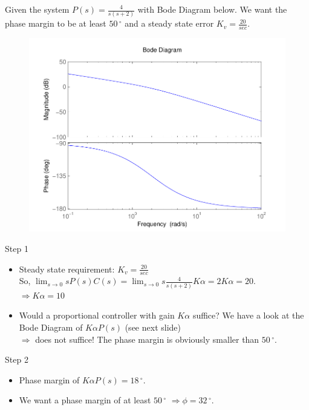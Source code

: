 \begin{frame}
\begin{example}
	Given the system $P(s) = \frac{4}{s(s+2)}$ with Bode Diagram below. 
	\vspace{0.1 cm}
	We want the phase margin to be at least $50\,^{\circ}$ and a steady state error $K_v = \frac{20}{sec}$.
	\begin{figure}
		\centering
		\includegraphics[width=0.5
		\linewidth]{bodeexamplelead}
	\end{figure}
\end{example}
\end{frame}

\begin{frame}
\begin{exampleblock}{Step 1}
\begin{itemize}	
\item Steady state requirement: $K_v = \frac{20}{sec}$ \\
So, $\lim_{s \to 0} sP(s)C(s) = \lim_{s \to 0} s\frac{4}{s(s+2)}K\alpha = 2K\alpha = 20$. \\
$\Rightarrow K\alpha = 10$
\item Would a proportional controller with gain $K\alpha$ suffice? We have a look at the Bode Diagram of $K\alpha P(s)$ (see next slide) \\
$\Rightarrow$ does not suffice! The phase margin is obviously smaller than $50\,^{\circ}$.
\end{itemize}
\end{exampleblock}
\begin{exampleblock}{Step 2}
	\begin{itemize}
	\item Phase margin of $K\alpha P(s) = 18\,^{\circ}$.
	\item We want a phase margin of at least $50\,^{\circ}$
	$\Rightarrow \phi = 32\,^{\circ}$.
	\end{itemize}
\end{exampleblock}
\end{frame}

